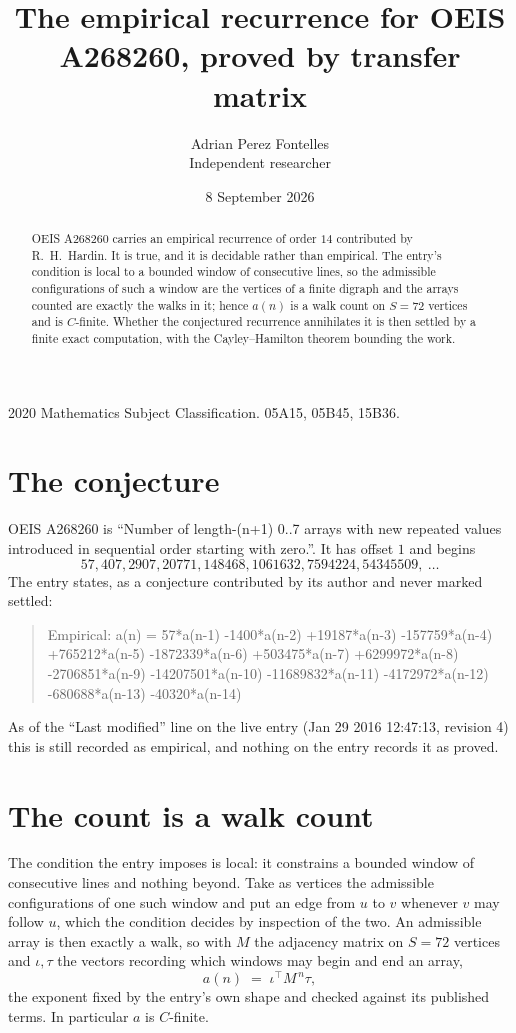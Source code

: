 \documentclass[11pt,a4paper]{article}
\title{The empirical recurrence for OEIS A268260, proved by transfer matrix}
\author{Adrian Perez Fontelles\\ \small Independent researcher}
\date{8 September 2026}
\theoremstyle{plain}
\theoremstyle{definition}
\begin{document}
\maketitle

\begin{abstract}
OEIS A268260 carries an empirical recurrence of order $14$ contributed by R.~H.~Hardin. It is
true, and it is decidable rather than empirical. The entry's condition is local to a bounded window of consecutive lines, so
the admissible configurations of such a window are the vertices of a finite digraph and the
arrays counted are exactly the walks in it; hence $a(n)$ is a walk count on $S=72$ vertices
and is $C$-finite. Whether the conjectured recurrence annihilates it is then settled by a
finite exact computation, with the Cayley--Hamilton theorem bounding the work.
\end{abstract}

\noindent\small 2020 Mathematics Subject Classification. 05A15, 05B45, 15B36.\normalsize

\section{The conjecture}

OEIS A268260 is ``Number of length-(n+1) 0..7 arrays with new repeated values introduced in sequential order starting with zero.''. It has offset $1$ and begins
\[
57, 407, 2907, 20771, 148468, 1061632, 7594224, 54345509,\ \dots
\]
The entry states, as a conjecture contributed by its author and never marked settled:
\begin{quote}
Empirical: a(n) = 57*a(n-1) -1400*a(n-2) +19187*a(n-3) -157759*a(n-4) +765212*a(n-5) -1872339*a(n-6) +503475*a(n-7) +6299972*a(n-8) -2706851*a(n-9) -14207501*a(n-10) -11689832*a(n-11) -4172972*a(n-12) -680688*a(n-13) -40320*a(n-14)
\end{quote}
As of the ``Last modified'' line on the live entry (Jan 29 2016 12:47:13, revision 4) this is still
recorded as empirical, and nothing on the entry records it as proved.

\section{The count is a walk count}

The condition the entry imposes is local: it constrains a bounded window of consecutive lines and nothing beyond. Take as
vertices the admissible configurations of one such window and put an edge from $u$ to $v$
whenever $v$ may follow $u$, which the condition decides by inspection of the two. An
admissible array is then exactly a walk, so with $M$ the adjacency matrix on $S=72$ vertices
and $\iota,\tau$ the vectors recording which windows may begin and end an array,
\[
a(n)\;=\;\iota^{\!\top}M^{\,n}\tau ,
\]
the exponent fixed by the entry's own shape and checked against its published terms. In
particular $a$ is $C$-finite.
\end{document}
